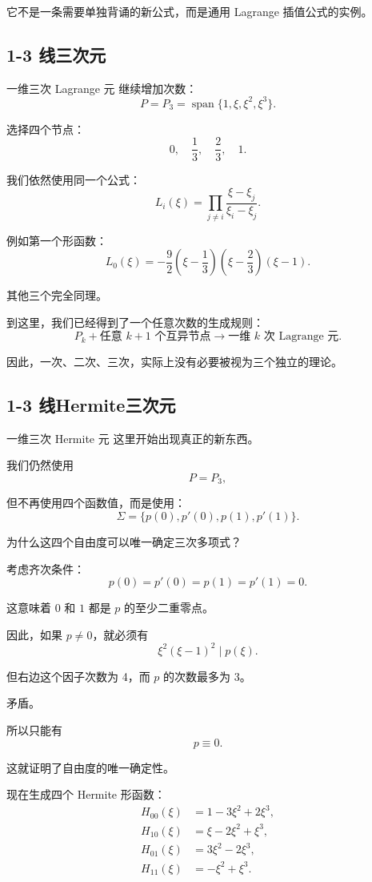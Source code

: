 它不是一条需要单独背诵的新公式，而是通用 Lagrange 插值公式的实例。


\subsection{1-3 线三次元}
一维三次 Lagrange 元
继续增加次数：
\[
    P=P_3=\operatorname{span}\{1,\xi,\xi^2,\xi^3\}.
\]

选择四个节点：
\[
    0,\quad\frac13,\quad\frac23,\quad1.
\]

我们依然使用同一个公式：
\[
    \boxed{
        L_i(\xi)=\prod_{j\ne i}
        \frac{\xi-\xi_j}{\xi_i-\xi_j}.
    }
\]

例如第一个形函数：
\[
    L_0(\xi)=
    -\frac92
    \left(\xi-\frac13\right)
    \left(\xi-\frac23\right)
    (\xi-1).
\]

其他三个完全同理。

到这里，我们已经得到了一个任意次数的生成规则：
\[
    \boxed{
        P_k+\text{任意 }k+1\text{ 个互异节点}
        \longrightarrow
        \text{一维 }k\text{ 次 Lagrange 元}.
    }
\]

因此，一次、二次、三次，实际上没有必要被视为三个独立的理论。


\subsection{1-3 线Hermite三次元}
一维三次 Hermite 元
这里开始出现真正的新东西。

我们仍然使用
\[
    P=P_3,
\]

但不再使用四个函数值，而是使用：
\[
    \boxed{
        \Sigma=\{p(0),p'(0),p(1),p'(1)\}.
    }
\]

为什么这四个自由度可以唯一确定三次多项式？

考虑齐次条件：
\[
    p(0)=p'(0)=p(1)=p'(1)=0.
\]

这意味着 \(0\) 和 \(1\) 都是 \(p\) 的至少二重零点。

因此，如果 \(p\ne0\)，就必须有
\[
    \xi^2(\xi-1)^2\mid p(\xi).
\]

但右边这个因子次数为 4，而 \(p\) 的次数最多为 3。

矛盾。

所以只能有
\[
    p\equiv0.
\]

这就证明了自由度的唯一确定性。

现在生成四个 Hermite 形函数：
\[
    \boxed{
        \begin{aligned}
            H_{00}(\xi) & =1-3\xi^2+2\xi^3,  \\
            H_{10}(\xi) & =\xi-2\xi^2+\xi^3, \\
            H_{01}(\xi) & =3\xi^2-2\xi^3,    \\
            H_{11}(\xi) & =-\xi^2+\xi^3.
        \end{aligned}
    }
\]


